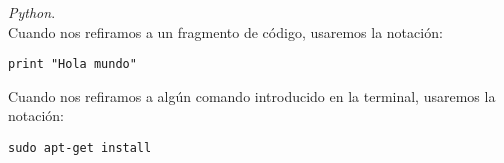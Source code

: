 \emph{Python}.\\

Cuando nos refiramos a un fragmento de código, usaremos la notación:

\begin{lstlisting}[style=Python, numbers=none]
print "Hola mundo" 
\end{lstlisting}

Cuando nos refiramos a algún comando introducido en la terminal, usaremos la notación:

\begin{lstlisting}[style=consola, numbers=none]
sudo apt-get install
\end{lstlisting}
